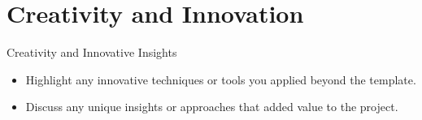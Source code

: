 \documentclass{beamer}
\begin{document}
\section{Creativity and Innovation}
\begin{frame}{Creativity and Innovative Insights}
    \begin{itemize}
        \item Highlight any innovative techniques or tools you applied beyond the template.
        \item Discuss any unique insights or approaches that added value to the project.
    \end{itemize}
\end{frame}

\end{document}
